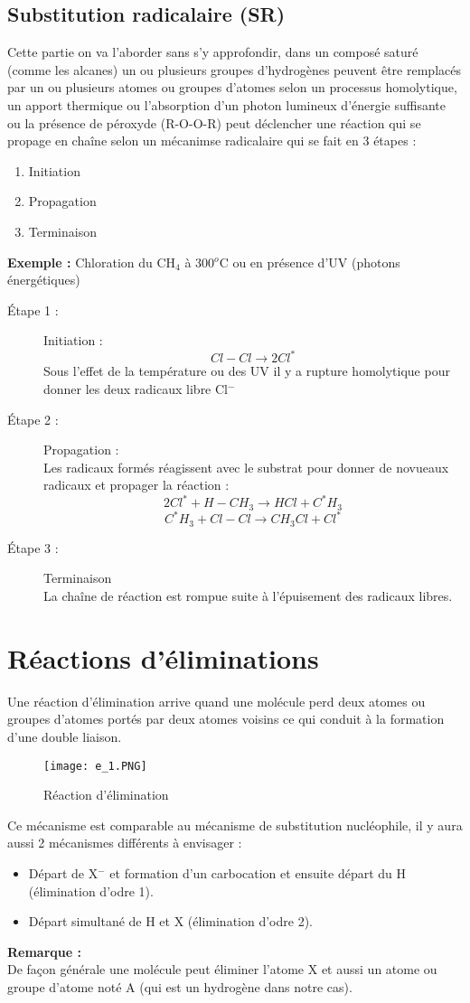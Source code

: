 \documentclass[a4paper, oneside]{book}
\begin{document}
\section{Substitution radicalaire (SR)}
Cette partie on va l'aborder sans s'y approfondir, dans un composé saturé (comme les alcanes) un ou plusieurs groupes d'hydrogènes peuvent être remplacés par un ou plusieurs atomes ou groupes d'atomes selon un processus homolytique, un apport thermique ou l'absorption d'un photon lumineux d'énergie suffisante ou la présence de péroxyde (R-O-O-R) peut déclencher une réaction qui se propage en chaîne selon un mécanimse radicalaire qui se fait en 3 étapes :
\begin{enumerate}
    \item Initiation
    \item Propagation
    \item Terminaison
\end{enumerate}
\textbf{Exemple :} Chloration du CH$_4$ à 300$^o$C ou en présence d'UV (photons énergétiques)
\begin{description}
    \item[\'Etape 1 :] Initiation :
    \[
        Cl - Cl \longrightarrow 2 Cl^*
    \]
    Sous l'effet de la température ou des UV il y a rupture homolytique pour donner les deux radicaux libre Cl$^-$
    \item[\'Etape 2 :] Propagation :\\
    Les radicaux formés réagissent avec le substrat pour donner de novueaux radicaux et propager la réaction :
    \[
        2 Cl^* + H - CH_3 \longrightarrow HCl + C^*H_3
    \]
    \[
        C^*H_3 + Cl - Cl \longrightarrow CH_3Cl + Cl^*
    \]
    \item[\'Etape 3 :] Terminaison\\
    La chaîne de réaction est rompue suite à l'épuisement des radicaux libres.
\end{description}
\chapter {Réactions d'éliminations}
\minitoc
Une réaction d'élimination arrive quand une molécule perd deux atomes ou groupes d'atomes portés par deux atomes voisins ce qui conduit à la formation d'une double liaison.
\begin{figure}[!h]
    \centering
    \texttt{[image: e\_1.PNG]}
    \caption{Réaction d'élimination}
    \label{fig:my_label}
\end{figure}
Ce mécanisme est comparable au mécanisme de substitution nucléophile, il y aura aussi 2 mécanismes différents à envisager : 
\begin{itemize}
    \item Départ de X$^-$ et formation d'un carbocation et ensuite départ du H (élimination d'odre 1).
    \item Départ simultané de H et X (élimination d'odre 2). 
\end{itemize}
\textbf{Remarque :}\\
De façon générale une molécule peut éliminer l'atome X et aussi un atome ou groupe d'atome noté A (qui est un hydrogène dans notre cas).
\end{document}
